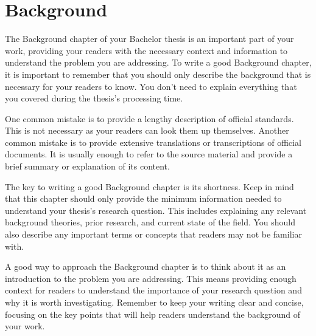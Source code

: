 \chapter{Background} \label{chap:background}

The Background chapter of your Bachelor thesis is an important part of your work, providing your readers with the necessary context and information to understand the problem you are addressing. To write a good Background chapter, it is important to remember that you should only describe the background that is necessary for your readers to know. You don't need to explain everything that you covered during the thesis's processing time.

One common mistake is to provide a lengthy description of official standards. This is not necessary as your readers can look them up themselves. Another common mistake is to provide extensive translations or transcriptions of official documents. It is usually enough to refer to the source material and provide a brief summary or explanation of its content.

The key to writing a good Background chapter is its shortness. Keep in mind that this chapter should only provide the minimum information needed to understand your thesis's research question. This includes explaining any relevant background theories, prior research, and current state of the field. You should also describe any important terms or concepts that readers may not be familiar with.

A good way to approach the Background chapter is to think about it as an introduction to the problem you are addressing. This means providing enough context for readers to understand the importance of your research question and why it is worth investigating. Remember to keep your writing clear and concise, focusing on the key points that will help readers understand the background of your work.